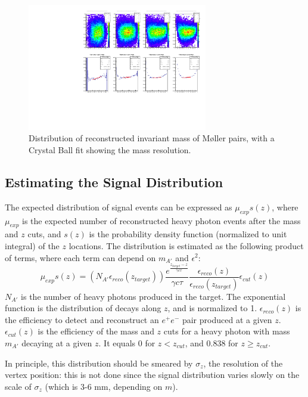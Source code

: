 \begin{figure}[ht]
\begin{center}
    \includegraphics[width=0.7\textwidth,page=17,angle=-90]{vertexing/figs/mollerplots}
\end{center}
    \caption{Distribution of reconstructed invariant mass of M{\o}ller pairs, with a Crystal Ball fit showing the mass resolution.}
    \label{fig:moller_mres}
\end{figure}

\clearpage
\subsection{Estimating the Signal Distribution}
\label{sec:signal_shape}
The expected distribution of signal events can be expressed as $\mu_{exp} s(z)$, where $\mu_{exp}$ is the expected number of reconstructed heavy photon events after the mass and $z$ cuts, and $s(z)$ is the probability density function (normalized to unit integral) of the $z$ locations.
The distribution is estimated as the following product of terms, where each term can depend on $m_{A'}$ and $\epsilon^2$:
\begin{equation}
\mu_{exp} s(z) = (N_{A'}\epsilon_{reco}(z_{target}))\frac{e^{\frac{z_{target}-z}{\gamma c \tau}}}{\gamma c \tau}\frac{\epsilon_{reco}(z)}{\epsilon_{reco}(z_{target})} \epsilon_{cut}(z)
\end{equation}
$N_{A'}$ is the number of heavy photons produced in the target.
The exponential function is the distribution of decays along $z$, and is normalized to 1.
$\epsilon_{reco}(z)$ is the efficiency to detect and reconstruct an $e^+e^-$ pair produced at a given $z$.
$\epsilon_{cut}(z)$ is the efficiency of the mass and $z$ cuts for a heavy photon with mass $m_{A'}$ decaying at a given $z$. It equals 0 for $z<z_{cut}$, and 0.838 for $z\ge z_{cut}$.

In principle, this distribution should be smeared by $\sigma_z$, the resolution of the vertex position: this is not done since the signal distribution varies slowly on the scale of $\sigma_z$ (which is 3-6 mm, depending on $m$).

